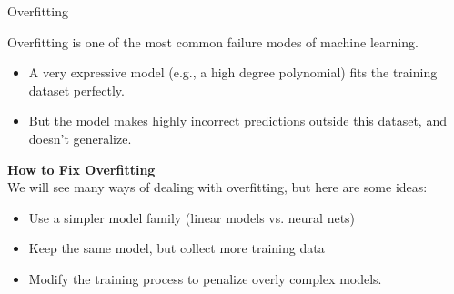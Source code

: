 \documentclass[../../main.tex]{subfiles}
\begin{document}
\begin{frame}{Overfitting}

Overfitting is one of the most common failure modes of machine learning.
 \begin{itemize}
     \item A very expressive model (e.g., a high degree polynomial) fits the training dataset perfectly.
 \end{itemize}
 \begin{itemize}
     \item But the model makes highly incorrect predictions outside this dataset, and doesn't generalize.
 \end{itemize}

\vspace{0.5cm}
\textbf{How to Fix Overfitting} \\
We will see many ways of dealing with overfitting, but here are some ideas:


     \begin{itemize}
         \item Use a simpler model family (linear models vs. neural nets)
     \end{itemize}
 
     \begin{itemize}
         \item Keep the same model, but collect more training data 
     \end{itemize}

      \begin{itemize}
          \item Modify the training process to penalize overly complex models.
      \end{itemize}


 
\end{frame}
\end{document}
